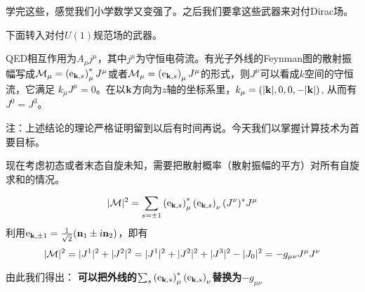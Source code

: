 \documentclass[CJK]{beamer}
\begin{document}
\begin{frame}
\bch
学完这些，感觉我们小学数学又变强了。之后我们要拿这些武器来对付Dirac场。
\skiplines

下面转入对付$U(1)$规范场的武器。
\ech
\end{frame}

\begin{frame}
\bch
{\small
QED相互作用为$A_\mu j^\mu$，其中$j^\mu$为守恒电荷流。有光子外线的Feynman图的散射振幅写成${\mathcal{M}}_\mu = \left(\mathrm{e}_{{\mathbf{k}},s}\right)_\mu^* J^\mu$或者${\mathcal{M}}_\mu = \left(\mathrm{e}_{{\mathbf{k}},s}\right)_\mu J^\mu$的形式，则$J^\mu$可以看成$k$空间的守恒流，它满足
$k_\mu J^\mu = 0$。在以${\mathbf{k}}$方向为$z$轴的坐标系里，$k_\mu =(|{\mathbf{k}}|, 0, 0, -|{\mathbf{k}}|)$, 从而有$J^0 = J^3$。

{\scriptsize 注：上述结论的理论严格证明留到以后有时间再说。今天我们以掌握计算技术为首要目标。}

现在考虑初态或者末态自旋未知，需要把散射概率（散射振幅的平方）对所有自旋求和的情况。

$$|{\mathcal{M}}|^2 = \sum_{s=\pm 1} \left(\mathrm{e}_{{\mathbf{k}},s}\right)^*_\mu \left(\mathrm{e}_{{\mathbf{k}},s}\right)_\nu (J^\nu)^*J^\mu $$
利用$\mathrm{e}_{{\mathbf{k}},\pm 1} = \frac{1}{\sqrt{2}}( {\mathbf{n}}_1 \pm {\dot{\imath}} {\mathbf{n}}_2)$，即有
$$|{\mathcal{M}}|^2 = |J^1|^2 + |J^2|^2 =  |J^1|^2 + |J^2|^2 + |J^3|^2 - |J_0|^2 = -g_{\mu\nu}J^\mu J^\nu $$

由此我们得出：
{\bf 可以把外线的$\sum_{s} \left(\mathrm{e}_{{\mathbf{k}},s}\right)^*_\mu \left(\mathrm{e}_{{\mathbf{k}},s}\right)_\nu$替换为$-g_{\mu\nu}$}
}

\ech

\end{frame}
\end{document}
